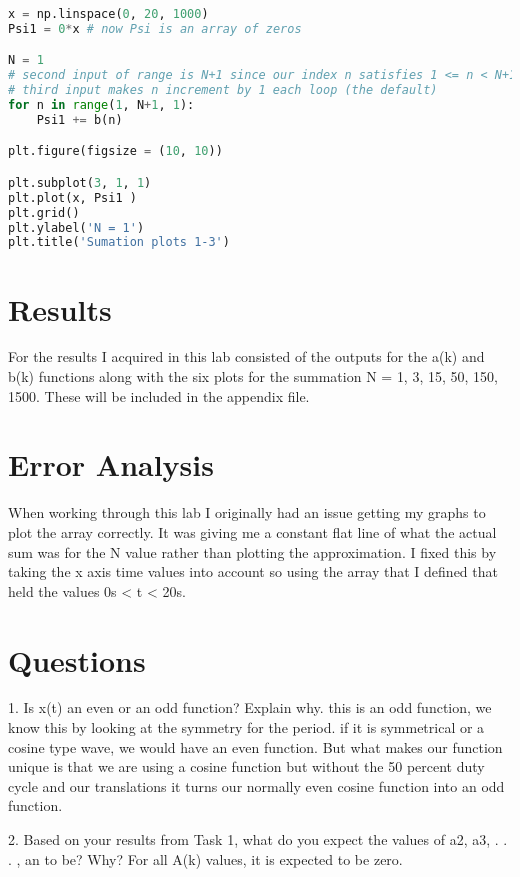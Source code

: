 \documentclass[12pt]{report}
\begin{document}
\begin{lstlisting}[language=Python]
x = np.linspace(0, 20, 1000) 
Psi1 = 0*x # now Psi is an array of zeros

N = 1
# second input of range is N+1 since our index n satisfies 1 <= n < N+1
# third input makes n increment by 1 each loop (the default)
for n in range(1, N+1, 1):
    Psi1 += b(n)

plt.figure(figsize = (10, 10))

plt.subplot(3, 1, 1)
plt.plot(x, Psi1 )
plt.grid()
plt.ylabel('N = 1')
plt.title('Sumation plots 1-3')

\end{lstlisting}

\section{Results}

For the results I acquired in this lab consisted of the outputs for the a(k) and b(k) functions along with the six plots for the summation N = {1, 3, 15, 50, 150, 1500}. These will be included in the appendix file. 

\section{Error Analysis}

When working through this lab I originally had an issue getting my graphs to plot the array correctly. It was giving me a constant flat line of what the actual sum was for the N value rather than plotting the approximation. I fixed this by taking the x axis time values into account so using the array that I defined that held the values 0s < t < 20s. 

\section{Questions}

1. Is x(t) an even or an odd function? Explain why.
this is an odd function, we know this by looking at the symmetry for the period. if it is symmetrical or a cosine type wave, we would have an even function. But what makes our function unique is that we are using a cosine function but without the 50 percent duty cycle and our translations it turns our normally even cosine function into an odd function.

2. Based on your results from Task 1, what do you expect the values of a2, a3, . . . , an to be? Why?
    For all A(k) values, it is expected to be zero.
\end{document}
